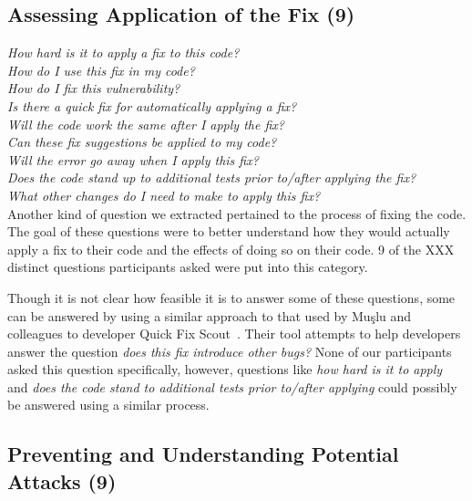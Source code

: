 \documentclass[conference]{IEEEtran}
\begin{document}

\noindent\subsection{\textbf{Assessing Application of the Fix (9)}}

\noindent\emph{How hard is it to apply a fix to this code?} \\
\emph{How do I use this fix in my code?} \\
\emph{How do I fix this vulnerability?} \\
\emph{Is there a quick fix for automatically applying a fix?} \\
\emph{Will the code work the same after I apply the fix?} \\
\emph{Can these fix suggestions be applied to my code?} \\
\emph{Will the error go away when I apply this fix?} \\
\emph{Does the code stand up to additional tests prior to/after applying the fix?} \\
\emph{What other changes do I need to make to apply this fix?} \\

Another kind of question we extracted pertained to the process of fixing the code. The goal of these questions were to better understand how they would actually apply a fix to their code and the effects of doing so on their code. 9 of the XXX distinct questions participants asked were put into this category.

Though it is not clear how feasible it is to answer some of these questions, some can be answered by using a similar approach to that used by Mu{\c{s}}lu and colleagues to developer Quick Fix Scout~\cite{mucslu2012speculative}. Their tool attempts to help developers answer the question \emph{does this fix introduce other bugs?} None of our participants asked this question specifically, however, questions like \emph{how hard is it to apply} and \emph{does the code stand to additional tests prior to/after applying} could possibly be answered using a similar process.

  


\noindent\subsection{\textbf{Preventing and Understanding Potential Attacks (9)}}
\end{document}
